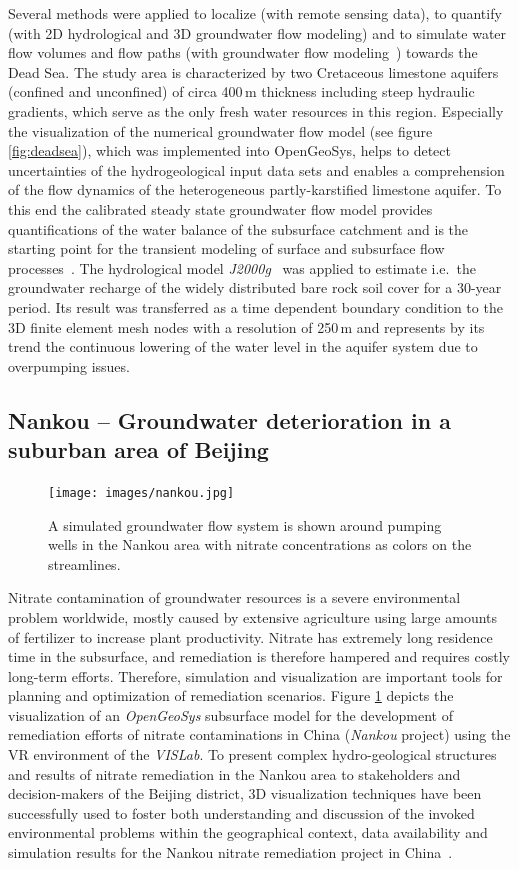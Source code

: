 \documentclass[twocolumn]{svjour3}          %
\begin{document}
Several methods were applied to localize (with remote sensing data), to quantify (with 2D hydrological and 3D groundwater flow modeling) and to simulate water flow volumes and flow paths (with groundwater flow modeling~\cite{graebe:modelcare}) towards the Dead Sea. The study area is characterized by two Cretaceous limestone aquifers (confined and unconfined) of circa 400\,m thickness including steep hydraulic gradients, which serve as the only fresh water resources in this region. Especially the visualization of the numerical groundwater flow model (see figure \ref{fig:deadsea}), which was implemented into OpenGeoSys, helps to detect uncertainties of the hydrogeological input data sets and enables a comprehension of the flow dynamics of the heterogeneous partly-karstified limestone aquifer. To this end the calibrated steady state groundwater flow model provides quantifications of the water balance of the subsurface catchment and is the starting point for the transient modeling of surface and subsurface flow processes~\cite{graebe:wessti}. The hydrological model \emph{J2000g}~\cite{KrauseKralisch:2005, Krause:2001} was applied to estimate i.e.~the groundwater recharge of the widely distributed bare rock soil cover for a 30-year period. Its result was transferred as a time dependent boundary condition to the 3D finite element mesh nodes with a resolution of 250\,m and represents by its trend the continuous lowering of the water level in the aquifer system due to overpumping issues.

\subsection{Nankou -- Groundwater deterioration in a suburban area of Beijing}
\label{nankou}

\begin{figure}[htb]
  \texttt{[image: images/nankou.jpg]}
\caption{A simulated groundwater flow system is shown around pumping wells in the Nankou area with nitrate concentrations as colors on the streamlines.}
\label{fig:nankou}
\end{figure}

Nitrate contamination of groundwater resources is a severe environmental problem worldwide, mostly caused by extensive agriculture using large amounts of fertilizer to increase plant productivity. Nitrate has extremely long residence time in the subsurface, and remediation is therefore hampered and requires costly long-term efforts. Therefore, simulation and visualization are important tools for planning and optimization of remediation scenarios. Figure \ref{fig:nankou} depicts the visualization of an \emph{OpenGeoSys} subsurface model for the development of remediation efforts of nitrate contaminations in China (\emph{Nankou} project) using the VR environment of the \emph{VISLab}. To present complex hydro-geological structures and results of nitrate remediation in the Nankou area to stakeholders and decision-makers of the Beijing district, 3D visualization techniques have been successfully used to foster both understanding and discussion of the invoked environmental problems within the geographical context, data availability and simulation results for the Nankou nitrate remediation project in China~\cite{sun:ees}.
\end{document}
